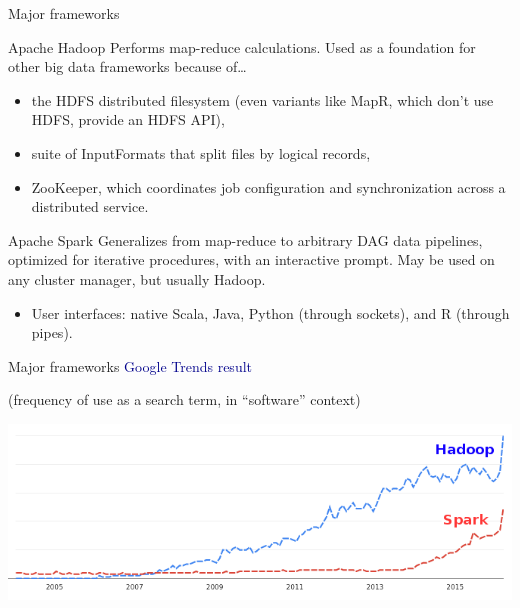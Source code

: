 \documentclass{beamer}
\begin{document}
\begin{frame}{Major frameworks}
\begin{block}{Apache Hadoop}
Performs map-reduce calculations. Used as a foundation for other big data frameworks because of\ldots
\begin{itemize}
\item the HDFS distributed filesystem (even variants like MapR, which don't use HDFS, provide an HDFS API),
\item suite of InputFormats that split files by logical records,
\item ZooKeeper, which coordinates job configuration and synchronization across a distributed service.
\end{itemize}
\end{block}

\begin{block}{Apache Spark}
Generalizes from map-reduce to arbitrary DAG data pipelines, optimized for iterative procedures, with an interactive prompt. May be used on any cluster manager, but usually Hadoop.
\begin{itemize}
\item User interfaces: native Scala, Java, Python (through sockets), and R (through pipes).
\end{itemize}
\end{block}
\end{frame}

\begin{frame}{Major frameworks}
\textcolor{darkblue}{Google Trends result}

(frequency of use as a search term, in ``software'' context)

\includegraphics[width=\linewidth]{trends.png}
\end{frame}
\end{document}
